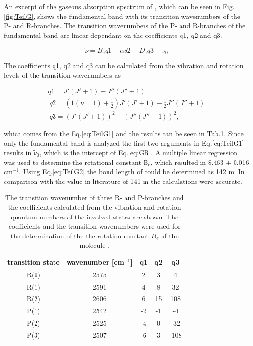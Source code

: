 \documentclass[a4paper,abstracton]{article}	                       %
\renewcommand{\cite}{\supercite}						%
\begin{document}
 An excerpt of the gaseous absorption spectrum of , which can be seen in Fig.\ref{fig:TeilG}, shows the fundamental band with its transition wavenumbers of the P- and R-branches. The transition wavenumbers of the P- and R-branches of the fundamental band are linear dependant on the coefficients q1, q2 and q3.
 
\begin{equation}\label{eq:GR}
   \tilde{\nu} = B_{e}q1 - \alpha q2 - D_{e}q3 + \tilde{\nu}_{0}
\end{equation}

The coefficients q1, q2 and q3 can be calculated from the vibration and rotation levels of the transition wavenumbers as

\begin{equation}\label{eq:Gq}
    \begin{split}
   q1 = J'(J' + 1) - J''(J'' + 1) \\\
   q2 = (1 (\nu = 1) + \frac{1}{2})J'(J' + 1) - \frac{1}{2}J''(J'' + 1) \\\
   q3 = (J'(J' + 1))^2 - (J''(J'' + 1))^2,
   \end{split}
\end{equation}

which comes from the Eq.\ref{eq:TeilG1} and the results can be seen in Tab.\ref{tab:TeilG}. Since only the fundamental band is analyzed the first two arguments in Eq.\ref{eq:TeilG1} results in $\tilde{\nu}_{0}$, which is the intercept of Eq.\ref{eq:GR}. A multiple linear regression was used to determine the rotational constant B$_{e}$, which resulted in 8.463 $\pm$ 0.016 cm$^{-1}$. Using Eq.\ref{eq:TeilG2} the bond length of  could be determined as 142 \p m. In comparison with the value in literature of 141 \p m\cite{HBr} the calculations were accurate.

\begin{table}[H]
\centering
\begin{tabular}{c|c|c|c|c}
    transition state & wavenumber [cm$^{-1}$] & q1 & q2 & q3\\
     \hline
    R(0) & 2575 & 2 & 3 & 4\\
    R(1) & 2591 & 4 & 8 & 32\\
    R(2) & 2606 & 6 & 15 & 108\\
     \hline
    P(1) & 2542 & -2 & -1 & -4\\
    P(2) & 2525 & -4 & 0 & -32\\
    P(3) & 2507 & -6 & 3 & -108\\
\end{tabular}
\caption{\label{tab:TeilG} The transition wavenumber of three R- and P-branches and the coefficients calculated from the vibration and rotation quantum numbers of the involved states are shown. The coefficients and the transition wavenumbers were used for the determination of the the rotation constant $B_{e}$ of the molecule . }
\end{table}
\end{document}
